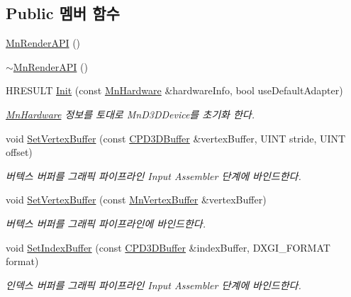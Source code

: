 \subsection*{Public 멤버 함수}
\begin{DoxyCompactItemize}
\item 
\hyperlink{class_m_n_l_1_1_mn_render_a_p_i_a3a2932d1caf86bbcfed50b08b1722c74}{Mn\+Render\+A\+PI} ()
\item 
\hyperlink{class_m_n_l_1_1_mn_render_a_p_i_a31ed631cea72b70971ca8917f6010876}{$\sim$\+Mn\+Render\+A\+PI} ()
\item 
H\+R\+E\+S\+U\+LT \hyperlink{class_m_n_l_1_1_mn_render_a_p_i_aef2f0aff53fac021b1c0b3e762d828ab}{Init} (const \hyperlink{class_m_n_l_1_1_mn_hardware}{Mn\+Hardware} \&hardware\+Info, bool use\+Default\+Adapter)
\begin{DoxyCompactList}\small\item\em \hyperlink{class_m_n_l_1_1_mn_hardware}{Mn\+Hardware} 정보를 토대로 Mn\+D3\+D\+Device를 초기화 한다. \end{DoxyCompactList}\item 
void \hyperlink{class_m_n_l_1_1_mn_render_a_p_i_aca919944367349ba7176b83de6954f29}{Set\+Vertex\+Buffer} (const \hyperlink{namespace_m_n_l_aab9c90a8c27ac6410a9cc7cd89efeef1}{C\+P\+D3\+D\+Buffer} \&vertex\+Buffer, U\+I\+NT stride, U\+I\+NT offset)
\begin{DoxyCompactList}\small\item\em 버텍스 버퍼를 그래픽 파이프라인 Input Assembler 단계에 바인드한다. \end{DoxyCompactList}\item 
void \hyperlink{class_m_n_l_1_1_mn_render_a_p_i_a4bcf2ac2d71b25663956493f2cd6c613}{Set\+Vertex\+Buffer} (const \hyperlink{class_m_n_l_1_1_mn_vertex_buffer}{Mn\+Vertex\+Buffer} \&vertex\+Buffer)
\begin{DoxyCompactList}\small\item\em 버텍스 버퍼를 그래픽 파이프라인에 바인드한다. \end{DoxyCompactList}\item 
void \hyperlink{class_m_n_l_1_1_mn_render_a_p_i_a0879f9c1a226921f157e17a308c49840}{Set\+Index\+Buffer} (const \hyperlink{namespace_m_n_l_aab9c90a8c27ac6410a9cc7cd89efeef1}{C\+P\+D3\+D\+Buffer} \&index\+Buffer, D\+X\+G\+I\+\_\+\+F\+O\+R\+M\+AT format)
\begin{DoxyCompactList}\small\item\em 인덱스 버퍼를 그래픽 파이프라인 Input Assembler 단계에 바인드한다. \end{DoxyCompactList}\item 

\end{DoxyCompactItemize}
